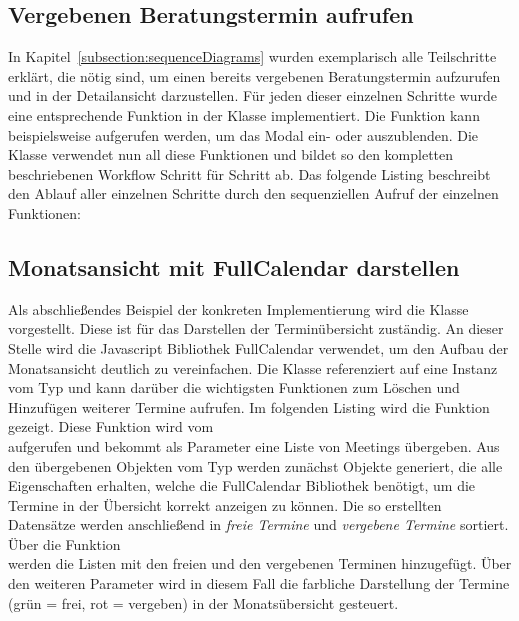 \subsection*{Vergebenen Beratungstermin aufrufen}

In Kapitel~\ref{subsection:sequenceDiagrams} wurden exemplarisch alle
Teilschritte erklärt, die nötig sind, um einen bereits vergebenen
Beratungstermin aufzurufen und in der Detailansicht darzustellen. Für jeden
dieser einzelnen Schritte wurde eine entsprechende Funktion in der Klasse
 implementiert. Die Funktion
 kann beispielsweise aufgerufen werden, um das
Modal ein- oder auszublenden. Die Klasse  verwendet
nun all diese Funktionen und bildet so den kompletten beschriebenen Workflow
Schritt für Schritt ab. Das folgende Listing beschreibt den Ablauf aller
einzelnen Schritte durch den sequenziellen Aufruf der einzelnen Funktionen:






\subsection*{Monatsansicht mit FullCalendar darstellen}

Als abschließendes Beispiel der konkreten Implementierung wird die Klasse
 vorgestellt. Diese ist für das Darstellen der
Terminübersicht zuständig. An dieser Stelle wird die Javascript Bibliothek
\gls{FullCalendar} verwendet, um den Aufbau der Monatsansicht deutlich zu vereinfachen. Die Klasse 
referenziert auf eine Instanz vom Typ  und kann darüber die
wichtigsten Funktionen zum Löschen und Hinzufügen weiterer Termine aufrufen. Im
folgenden Listing wird die Funktion  gezeigt.
Diese Funktion wird vom\\
 aufgerufen und bekommt als
Parameter eine Liste von Meetings übergeben. Aus den übergebenen Objekten vom
Typ  werden zunächst Objekte generiert, die alle Eigenschaften
erhalten, welche die FullCalendar Bibliothek benötigt, um die Termine
in der Übersicht korrekt anzeigen zu können. Die so erstellten Datensätze
werden anschließend in \textit{freie Termine} und \textit{vergebene Termine}
sortiert. Über die Funktion\\
werden die Listen mit den freien und den vergebenen Terminen hinzugefügt. Über
den weiteren Parameter  wird in diesem Fall die farbliche
Darstellung der Termine (grün = frei, rot = vergeben) in der Monatsübersicht gesteuert.

